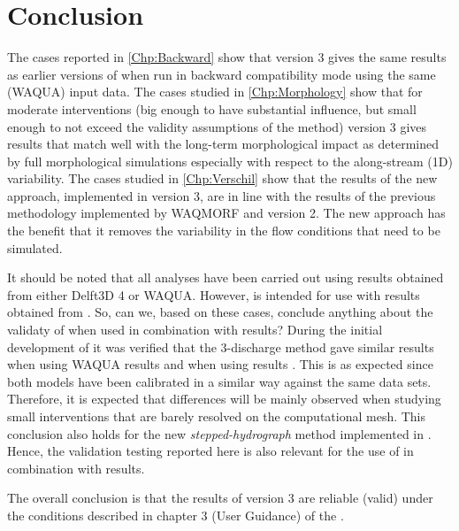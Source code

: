 \chapter{Conclusion}

The cases reported in \autoref{Chp:Backward} show that \dfmi version 3 gives the same results as earlier versions of \dfmi when run in backward compatibility mode using the same (WAQUA) input data.
The cases studied in \autoref{Chp:Morphology} show that for moderate interventions (big enough to have substantial influence, but small enough to not exceed the validity assumptions of the method) \dfmi version 3 gives results that match well with the long-term morphological impact as determined by full morphological simulations especially with respect to the along-stream (1D) variability.
The cases studied in \autoref{Chp:Verschil} show that the results of the new approach, implemented in \dfmi version 3, are in line with the results of the previous methodology implemented by WAQMORF and \dfmi version 2.
The new approach has the benefit that it removes the variability in the flow conditions that need to be simulated.

It should be noted that all analyses have been carried out using results obtained from either Delft3D 4 or WAQUA.
However,  is intended for use with results obtained from \dflowfm.
So, can we, based on these cases, conclude anything about the validaty of  when used in combination with \dflowfm results?
During the initial development of  it was verified that the 3-discharge method gave similar results when using WAQUA results and when using \dflowfm results \citep{DFAST2020}.
This is as expected since both models have been calibrated in a similar way against the same data sets.
Therefore, it is expected that differences will be mainly observed when studying small interventions that are barely resolved on the computational mesh.
This conclusion also holds for the new \emph{stepped-hydrograph} method implemented in .
Hence, the validation testing reported here is also relevant for the use of  in combination with \dflowfm results.

The overall conclusion is that the results of \dfmi version 3 are reliable (valid) under the conditions described in chapter 3 (User Guidance) of the \citet{um}.
